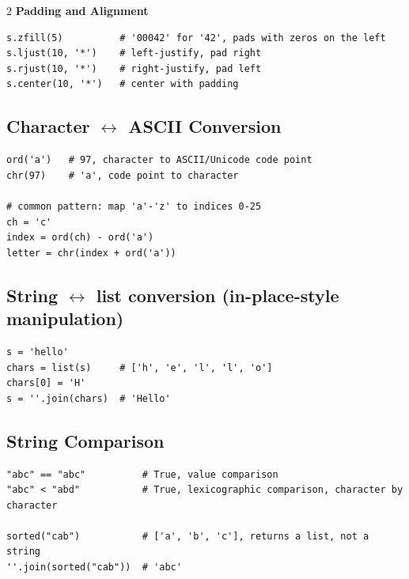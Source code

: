 \documentclass[9pt,a4paper]{extarticle}
\begin{document}
\begin{multicols}{2}
\noindent\textbf{Padding and Alignment}\par\nopagebreak\vspace{1pt}

\begin{lstlisting}
s.zfill(5)          # '00042' for '42', pads with zeros on the left
s.ljust(10, '*')    # left-justify, pad right
s.rjust(10, '*')    # right-justify, pad left
s.center(10, '*')   # center with padding
\end{lstlisting}

\subsection{Character \texorpdfstring{$\leftrightarrow$}{$\leftrightarrow$} ASCII Conversion}

\begin{lstlisting}
ord('a')   # 97, character to ASCII/Unicode code point
chr(97)    # 'a', code point to character

# common pattern: map 'a'-'z' to indices 0-25
ch = 'c'
index = ord(ch) - ord('a')
letter = chr(index + ord('a'))
\end{lstlisting}

\subsection{String \texorpdfstring{$\leftrightarrow$}{$\leftrightarrow$} list conversion (in-place-style manipulation)}

\begin{lstlisting}
s = 'hello'
chars = list(s)     # ['h', 'e', 'l', 'l', 'o']
chars[0] = 'H'
s = ''.join(chars)  # 'Hello'
\end{lstlisting}

\subsection{String Comparison}

\begin{lstlisting}
"abc" == "abc"          # True, value comparison
"abc" < "abd"           # True, lexicographic comparison, character by character

sorted("cab")           # ['a', 'b', 'c'], returns a list, not a string
''.join(sorted("cab"))  # 'abc'
\end{lstlisting}

\end{multicols}
\end{document}
